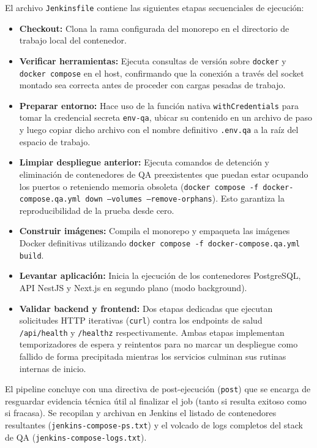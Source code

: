 \documentclass{article}
\begin{document}
El archivo \texttt{Jenkinsfile} contiene las siguientes etapas secuenciales de ejecución:
\begin{itemize}[leftmargin=*]
    \item \textbf{Checkout:} Clona la rama configurada del monorepo en el directorio de trabajo local del contenedor.
    \item \textbf{Verificar herramientas:} Ejecuta consultas de versión sobre \texttt{docker} y \texttt{docker compose} en el host, confirmando que la conexión a través del socket montado sea correcta antes de proceder con cargas pesadas de trabajo.
    \item \textbf{Preparar entorno:} Hace uso de la función nativa \texttt{withCredentials} para tomar la credencial secreta \texttt{env-qa}, ubicar su contenido en un archivo de paso y luego copiar dicho archivo con el nombre definitivo \texttt{.env.qa} a la raíz del espacio de trabajo.
    \item \textbf{Limpiar despliegue anterior:} Ejecuta comandos de detención y eliminación de contenedores de QA preexistentes que puedan estar ocupando los puertos o reteniendo memoria obsoleta (\texttt{docker compose -f docker-compose.qa.yml down --volumes --remove-orphans}). Esto garantiza la reproducibilidad de la prueba desde cero.
    \item \textbf{Construir imágenes:} Compila el monorepo y empaqueta las imágenes Docker definitivas utilizando \texttt{docker compose -f docker-compose.qa.yml build}.
    \item \textbf{Levantar aplicación:} Inicia la ejecución de los contenedores PostgreSQL, API NestJS y Next.js en segundo plano (modo background).
    \item \textbf{Validar backend y frontend:} Dos etapas dedicadas que ejecutan solicitudes HTTP iterativas (\texttt{curl}) contra los endpoints de salud \texttt{/api/health} y \texttt{/healthz} respectivamente. Ambas etapas implementan temporizadores de espera y reintentos para no marcar un despliegue como fallido de forma precipitada mientras los servicios culminan sus rutinas internas de inicio.
\end{itemize}

El pipeline concluye con una directiva de post-ejecución (\texttt{post}) que se encarga de resguardar evidencia técnica útil al finalizar el job (tanto si resulta exitoso como si fracasa). Se recopilan y archivan en Jenkins el listado de contenedores resultantes (\texttt{jenkins-compose-ps.txt}) y el volcado de logs completos del stack de QA (\texttt{jenkins-compose-logs.txt}).
\end{document}
